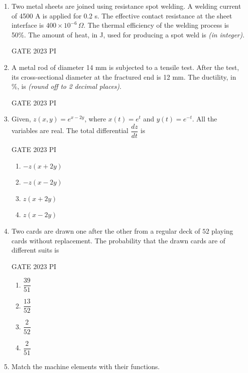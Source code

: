 \documentclass[journal,12pt,onecolumn]{IEEEtran}
\theoremstyle{remark}
\begin{document}
\begin{enumerate}
\item Two metal sheets are joined using resistance spot welding. A welding current of 4500 A is applied for 0.2 s. The effective contact resistance at the sheet interface is $400 \times 10^{-6}\, \Omega$. The thermal efficiency of the welding process is 50\%. The amount of heat, in J, used for producing a spot weld is \underline{\hspace{2cm}} \textit{(in integer)}.

\hfill{GATE 2023 PI}

\item A metal rod of diameter 14 mm is subjected to a tensile test. After the test, its cross-sectional diameter at the fractured end is 12 mm. The ductility, in \%, is \underline{\hspace{2cm}} \textit{(round off to 2 decimal places)}.

\hfill{GATE 2023 PI}
\item Given, $z(x, y) = e^{x - 2y}$, where $x(t) = e^{t}$ and $y(t) = e^{-t}$. All the variables are real. The total differential $\dfrac{dz}{dt}$ is

\hfill{GATE 2023 PI}

\begin{multicols}{2}
\begin{enumerate}
    \item $-z(x + 2y)$
    \item $-z(x - 2y)$
    \item $z(x + 2y)$
    \item $z(x - 2y)$
\end{enumerate}
\end{multicols}

\item Two cards are drawn one after the other from a regular deck of $52$ playing cards without replacement. The probability that the drawn cards are of different suits is

\hfill{GATE 2023 PI}

\begin{multicols}{2}
\begin{enumerate}
    \item $\dfrac{39}{51}$
    \item $\dfrac{13}{52}$
    \item $\dfrac{2}{52}$
    \item $\dfrac{2}{51}$
\end{enumerate}
\end{multicols}

\item Match the machine elements with their functions.


\end{enumerate}
\end{document}
